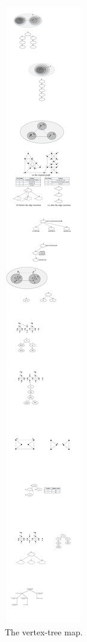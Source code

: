 \begin{figure}[ht]
    \centering
    \includegraphics[width=0.8\linewidth]{figures/traceChild}
    \caption{The vertex-tree map.}
    \label{fig:trace}
\end{figure}


